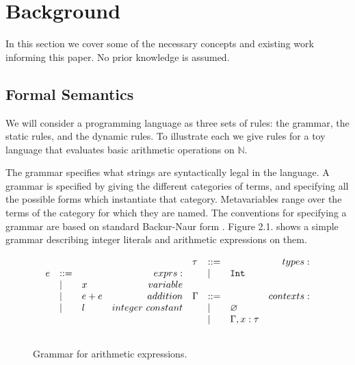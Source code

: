 \chapter{Background}\label{C:background}

In this section we cover some of the necessary concepts and existing work informing this paper. No prior knowledge is assumed.

\section{Formal Semantics}

\noindent
We will consider a programming language as three sets of rules: the grammar, the static rules, and the dynamic rules. To illustrate each we give rules for a toy language that evaluates basic arithmetic operations on $\mathbb{N}$.

The grammar specifies what strings are syntactically legal in the language. A grammar is specified by giving the different categories of terms, and specifying all the possible forms which instantiate that category. Metavariables range over the terms of the category for which they are named. The conventions for specifying a grammar are based on standard Backur-Naur form \cite{bnf}. Figure 2.1. shows a simple grammar describing integer literals and arithmetic expressions on them.

\begin{figure}[h]

\[
\begin{array}{c}

\begin{array}{lllr}

e & ::= & ~ & exprs: \\
	& | & x & variable \\
	& | & e + e & addition \\
	& | & l & integer~constant \\
	&&\\

\end{array}

\begin{array}{lllr}

\tau & ::= & ~ & types: \\
	& | & \mathtt{Int} \\
	&&\\
	
\Gamma & ::= & ~ & contexts: \\
	& | & \varnothing \\
	& | & \Gamma, x: \tau \\
	&&\\

\end{array}

\end{array}
\]

\vspace{-7pt}
\caption{Grammar for arithmetic expressions.}
\label{A sample. }
\end{figure}

